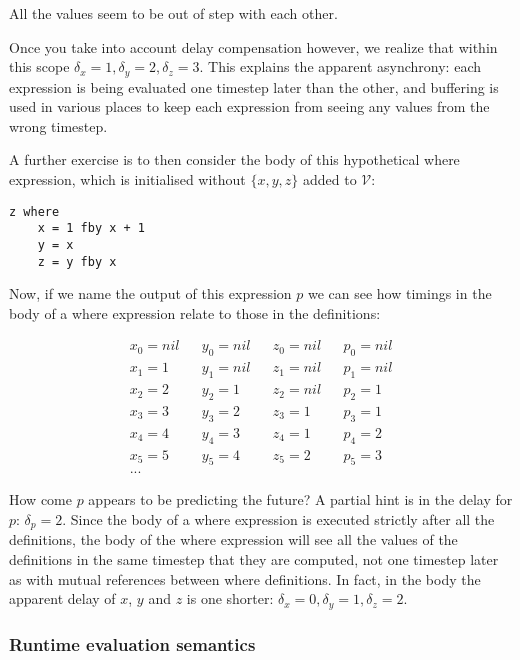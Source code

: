 \documentclass{scrartcl}
\begin{document}
    All the values seem to be out of step with each other.
    
    Once you take into account delay compensation however, we realize that within this scope $\delta_x = 1, \delta_y = 2, \delta_z = 3$. This explains the apparent asynchrony: each expression is being evaluated one timestep later than the other, and buffering is used in various places to keep each expression from seeing any values from the wrong timestep.
    
    A further exercise is to then consider the body of this hypothetical where expression, which is initialised without $\{x, y, z\}$ added to $\mathcal{V}$:
    
    \begin{lstlisting}
z where
    x = 1 fby x + 1
    y = x
    z = y fby x
    \end{lstlisting}
    
    Now, if we name the output of this expression $p$ we can see how timings in the body of a where expression relate to those in the definitions:
    
    \begin{align*}
    x_0 = nil && y_0 = nil && z_0 = nil && p_0 = nil \\
    x_1 = 1 && y_1 = nil && z_1 = nil && p_1 = nil \\
    x_2 = 2 && y_2 = 1 && z_2 = nil && p_2 = 1 \\
    x_3 = 3 && y_3 = 2 && z_3 = 1 && p_3 = 1 \\
    x_4 = 4 && y_4 = 3 && z_4 = 1 && p_4 = 2\\
    x_5 = 5 && y_5 = 4 && z_5 = 2 && p_5 = 3\\
    ...
    \end{align*}
    
    How come $p$ appears to be predicting the future? A partial hint is in the delay for $p$: $\delta_p = 2$. Since the body of a where expression is executed strictly after all the definitions, the body of the where expression will see all the values of the definitions in the same timestep that they are computed, not one timestep later as with mutual references between where definitions. In fact, in the body the apparent delay of $x$, $y$ and $z$ is one shorter: $\delta_x = 0, \delta_y = 1, \delta_z = 2$.
    
    \subsubsection{Runtime evaluation semantics}
    
\end{document}
